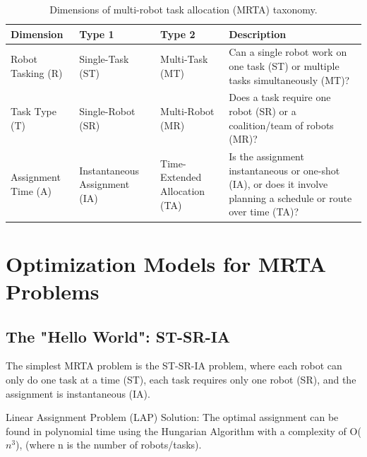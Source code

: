 \begin{table}[h!]
\centering
\renewcommand{\arraystretch}{1.2}
\begin{tabularx}{\textwidth}{@{}>{\centering\arraybackslash}p{3cm}|
                                  >{\centering\arraybackslash}p{2.5cm}|
                                  >{\centering\arraybackslash}p{2.5cm}|
                                  X@{}}
\toprule
\textbf{Dimension} & \textbf{Type 1} & \textbf{Type 2} & \textbf{Description} \\ \midrule
Robot Tasking (R) & Single-Task (ST) & Multi-Task (MT) & Can a single robot work on one task (ST) or multiple tasks simultaneously (MT)? \\ \addlinespace
Task Type (T) & Single-Robot (SR) & Multi-Robot (MR) & Does a task require one robot (SR) or a coalition/team of robots (MR)? \\ \addlinespace
Assignment Time (A) & Instantaneous Assignment (IA) & Time-Extended Allocation (TA) & Is the assignment instantaneous or one-shot (IA), or does it involve planning a schedule or route over time (TA)? \\
\bottomrule
\end{tabularx}
\caption{Dimensions of multi-robot task allocation (MRTA) taxonomy.}
\label{tab:mrta-dimensions}
\end{table}

\section*{Optimization Models for MRTA Problems}

\subsection*{The "Hello World": ST-SR-IA}
The simplest MRTA problem is the ST-SR-IA problem, where each robot can only do one task at a time (ST), each task requires only one robot (SR), and the assignment is instantaneous (IA).

Linear Assignment Problem (LAP) Solution: The optimal assignment can be found in polynomial time using the Hungarian Algorithm with a complexity of O($n^3$), (where n is the number of robots/tasks).

